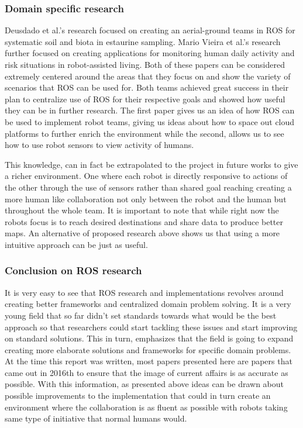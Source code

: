       \subsubsection{Domain specific research}
        Deusdado et al.'s\cite{Pedro} research focused on creating an aerial-ground teams in ROS for systematic soil and biota in estaurine sampling. Mario Vieira et al.'s research further focused on creating applications for monitoring human daily activity and risk situations in robot-assisted living. Both of these papers can be considered extremely centered around the areas that they focus on and show the variety of scenarios that ROS can be used for. Both teams achieved great success in their plan to centralize use of ROS for their respective goals and showed how useful they can be in further research. The first paper gives us an idea of how ROS can be used to implement robot teams, giving us ideas about how to space out cloud platforms to further enrich the environment while the second, allows us to see how to use robot sensors to view activity of humans. 

        This knowledge, can in fact be extrapolated to the project in future works to give a richer environment. One where each robot is directly responsive to actions of the other through the use of sensors rather than shared goal reaching creating a more human like collaboration not only between the robot and the human but throughout the whole team. It is important to note that while right now the robots focus is to reach desired destinations and share data to produce better maps. An alternative of proposed research above shows us that using a more intuitive approach can be just as useful.

      \subsubsection{Conclusion on ROS research}
        It is very easy to see that ROS research and implementations revolves around creating better frameworks and centralized domain problem solving. It is a very young field that so far didn't set standards towards what would be the best approach so that researchers could start tackling these issues and start improving on standard solutions. This in turn, emphasizes that the field is going to expand creating more elaborate solutions and frameworks for specific domain problems. At the time this report was written, most papers presented here are papers that came out in 2016th to ensure that the image of current affairs is as accurate as possible. With this information, as presented above ideas can be drawn about possible improvements to the implementation that could in turn create an environment where the collaboration is as fluent as possible with robots taking same type of initiative that normal humans would.


